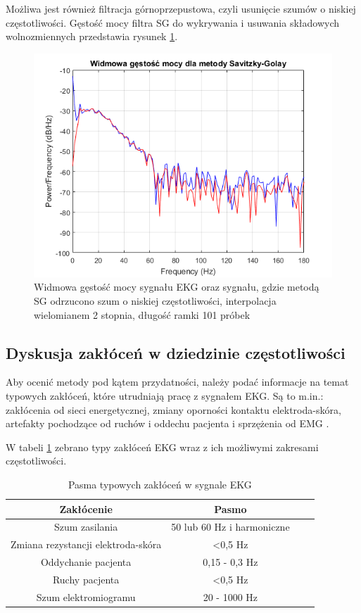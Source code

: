 Możliwa jest również filtracja górnoprzepustowa, czyli usunięcie szumów o niskiej częstotliwości. Gęstość mocy filtra SG do wykrywania i usuwania składowych wolnozmiennych przedstawia rysunek \ref{rys:sg1}.

\begin{figure}[H]
  \begin{center}
    \includegraphics[scale=0.9]
    {img/PSD_SG_M50.png}
  \end{center}
  \caption{Widmowa gęstość mocy sygnału EKG oraz sygnału, gdzie metodą SG odrzucono szum o niskiej częstotliwości, interpolacja wielomianem 2 stopnia, długość ramki 101 próbek}
  \label{rys:sg1}
\end{figure}


\subsection{Dyskusja zakłóceń w dziedzinie częstotliwości}

Aby ocenić metody pod kątem przydatności, należy podać informacje na temat typowych zakłóceń, które utrudniają pracę z sygnałem EKG. Są to m.in.: zakłócenia od sieci energetycznej, zmiany oporności kontaktu elektroda-skóra, artefakty pochodzące od ruchów i oddechu pacjenta i sprzężenia od EMG \cite{Djordje}.

W tabeli \ref{tab:noise} zebrano typy zakłóceń EKG wraz z ich możliwymi zakresami częstotliwości.

\begin{table}[!htbp]
  \centering
  \begin{tabular}{|c|c|c|c|}
  \hline 
  Zakłócenie & Pasmo \\  
  \hline 
  Szum zasilania & 50 lub 60 Hz i harmoniczne \\
  \hline
  Zmiana rezystancji elektroda-skóra & \textless 0,5 Hz \\
  \hline
  Oddychanie pacjenta &  0,15 - 0,3 Hz \\
  \hline
  Ruchy pacjenta & \textless 0,5 Hz \\
  \hline
  Szum elektromiogramu & 20 - 1000 Hz \\
  \hline
\end{tabular} 
\caption{Pasma typowych zakłóceń w sygnale EKG}
\label{tab:noise}
\end{table}

